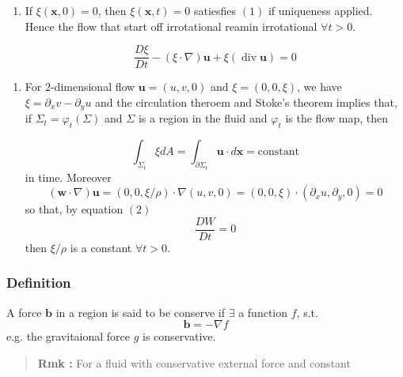 \begin{enumerate}
	\item If $\xi(\textbf{x},0) = 0$, then $\xi(\textbf{x},t) = 0$ satiesfies $(1)$ if uniqueness applied. Hence the flow that start off irrotational reamin irrotational $\forall t>0$.

\begin{equation}
\frac{D\xi}{Dt} - \left(\xi\cdot\nabla\right)\textbf{u} + \xi \left(\operatorname{div}\textbf{u}\right) = 0
\end{equation}

\end{enumerate}
\begin{enumerate}
	\item For $2$-dimensional flow $\textbf{u} = (u,v,0)$ and $\xi = (0,0,\xi)$, we have $\xi = \partial_x v - \partial_y u$ and the circulation theroem and Stoke's theorem implies that, if $\Sigma_t = \varphi_t(\Sigma)$ and $\Sigma$ is a region in the fluid and $\varphi_t$ is the flow map, then

\begin{equation}
\int_{\Sigma_t} \xi dA = \int_{\partial \Sigma_t} \textbf{u}\cdot d\textbf{x} = \text{constant}
\end{equation}
    in time. Moreover
\begin{equation}
\left(\textbf{w}\cdot \nabla\right)\textbf{u} = (0,0,\xi/\rho)\cdot \nabla(u,v,0)
= (0,0,\xi) \cdot (\partial_x u, \partial_y,0 ) = 0
\end{equation}
    so that, by equation $(2)$
\begin{equation}
\frac{DW}{Dt} = 0
\end{equation}
    then $\xi/\rho$ is a constant $\forall t>0$.

\end{enumerate}
\subsubsection{Definition} %

A force $\textbf{b}$ in a region is said to be conserve if $\exists$ a function $f$, s.t.
\begin{equation}
\textbf{b} = -\nabla f
\end{equation}
e.g. the gravitaional force $g$ is conservative.

\begin{quote}
	\textbf{Rmk :}
For a fluid with conservative external force and constant
\end{quote}

